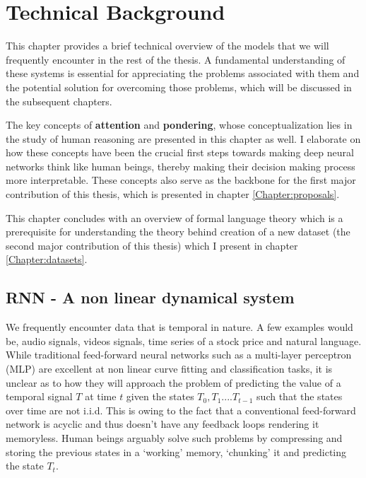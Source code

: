 \chapter{Technical Background}\label{Chapter:Theory}
This chapter provides a brief technical overview of the models that we will frequently encounter in the rest of the thesis. A fundamental understanding of these systems is essential for appreciating the problems associated with them and the potential solution for overcoming those problems, which will be discussed in the subsequent chapters. 

The key concepts of \textbf{attention} and \textbf{pondering}, whose conceptualization lies in the study of human reasoning are presented in this chapter as well. I elaborate on how these concepts have been the crucial first steps towards making deep neural networks think like human beings, thereby making their decision making process more interpretable. These concepts also serve as the backbone for the first major contribution of this thesis, which is presented in chapter \ref{Chapter:proposals}.

This chapter concludes with an overview of formal language theory which is a prerequisite for understanding the theory behind creation of a new dataset (the second major contribution of this thesis) which I present in chapter \ref{Chapter:datasets}.

\section{RNN - A non linear dynamical system} \label{RNN}
We frequently encounter data that is temporal in nature. A few examples would  be, audio signals, videos signals, time series of a stock price and natural language. While traditional feed-forward neural networks such as a multi-layer perceptron (MLP) \citep{rosenblatt1962} are excellent at non linear curve fitting and classification tasks, it is unclear as to how they will approach the problem of predicting the value of a temporal signal $T$ at time $t$ given the states $T_{0}, T_{1}....T_{t-1}$ such that the states over time are not i.i.d. This is owing to the fact that a conventional feed-forward network  is acyclic and thus doesn't have any feedback loops rendering it memoryless. Human beings arguably solve such problems by compressing and storing the previous states in a \lq working\rq{} memory,\citep{Miller1956} \lq chunking\rq{} it \citep{neath2013} \citep{craik2000} and predicting the state $T_t$. 

